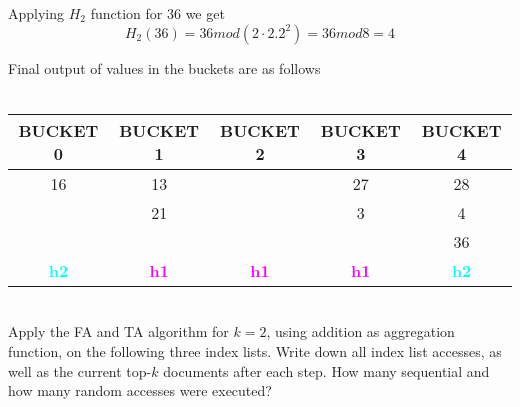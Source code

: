 Applying $H_2$ function for 36 we get
\[H_2(36) = 36 mod (2 \cdot 2.2^2)  = 36 mod 8 = 4\]

Final output of values in the buckets are as follows
\\
\\
\begin{tabular}{ |c|c|c|c|c|} 
 \hline
  BUCKET 0 & \textbf{\color{red}{P}} BUCKET 1 & BUCKET 2 & BUCKET 3 & BUCKET 4\\ [0.5ex] 
 \hline\hline
 \hline
  16 & 13 &  & 27& 28\\ 
    & 21 &  & 3& 4\\
     &  &  &  &36\\
 \hline
 \hline
\textbf{\textcolor{cyan}{h2}} & \textbf{\textcolor{magenta}{h1}}& \textbf{\textcolor{magenta}{h1}}&\textbf{\textcolor{magenta}{h1}}&\textbf{\textcolor{cyan}{h2}}\\ [0.5ex] 
 \hline
\end{tabular}
\newpage
{}
\\
Apply the FA and TA algorithm for $k=2$, using addition as aggregation function, on the following three index lists.
 Write down all index list accesses, as well as the current top-$k$ documents after each step.
 How many sequential and how many random accesses were executed?

